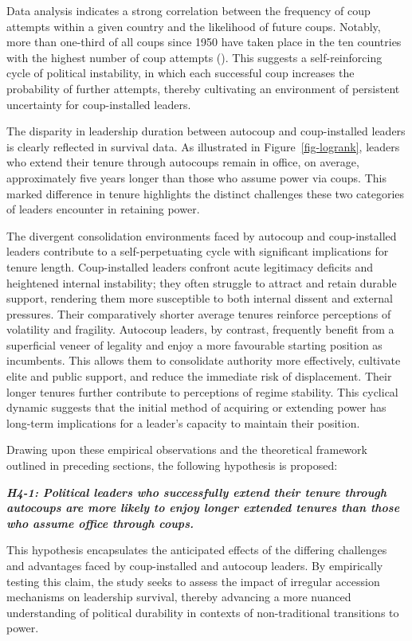 \documentclass[
  12pt,
]{report}
\begin{document}
Data analysis indicates a strong correlation between the frequency of
coup attempts within a given country and the likelihood of future coups.
Notably, more than one-third of all coups since 1950 have taken place in
the ten countries with the highest number of coup attempts
(). This suggests a
self-reinforcing cycle of political instability, in which each
successful coup increases the probability of further attempts, thereby
cultivating an environment of persistent uncertainty for coup-installed
leaders.

The disparity in leadership duration between autocoup and coup-installed
leaders is clearly reflected in survival data. As illustrated in
Figure~\ref{fig-logrank}, leaders who extend their tenure through
autocoups remain in office, on average, approximately five years longer
than those who assume power via coups. This marked difference in tenure
highlights the distinct challenges these two categories of leaders
encounter in retaining power.

The divergent consolidation environments faced by autocoup and
coup-installed leaders contribute to a self-perpetuating cycle with
significant implications for tenure length. Coup-installed leaders
confront acute legitimacy deficits and heightened internal instability;
they often struggle to attract and retain durable support, rendering
them more susceptible to both internal dissent and external pressures.
Their comparatively shorter average tenures reinforce perceptions of
volatility and fragility. Autocoup leaders, by contrast, frequently
benefit from a superficial veneer of legality and enjoy a more
favourable starting position as incumbents. This allows them to
consolidate authority more effectively, cultivate elite and public
support, and reduce the immediate risk of displacement. Their longer
tenures further contribute to perceptions of regime stability. This
cyclical dynamic suggests that the initial method of acquiring or
extending power has long-term implications for a leader's capacity to
maintain their position.

Drawing upon these empirical observations and the theoretical framework
outlined in preceding sections, the following hypothesis is proposed:

\textbf{\emph{H4-1: Political leaders who successfully extend their
tenure through autocoups are more likely to enjoy longer extended
tenures than those who assume office through coups.}}

This hypothesis encapsulates the anticipated effects of the differing
challenges and advantages faced by coup-installed and autocoup leaders.
By empirically testing this claim, the study seeks to assess the impact
of irregular accession mechanisms on leadership survival, thereby
advancing a more nuanced understanding of political durability in
contexts of non-traditional transitions to power.
\end{document}
